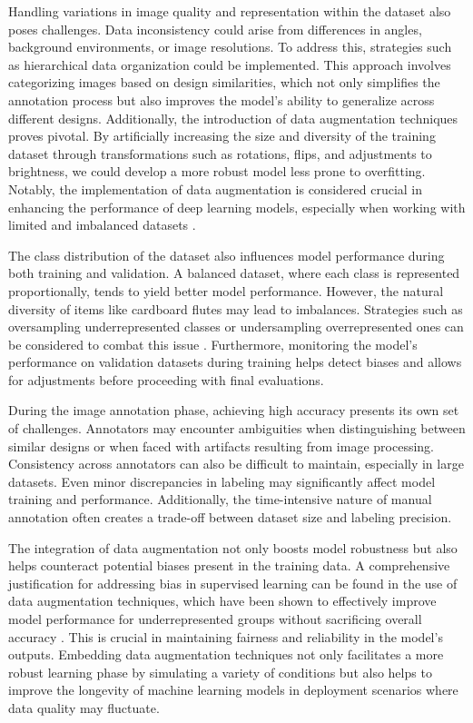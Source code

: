 Handling variations in image quality and representation within the dataset also poses challenges. Data inconsistency could arise from differences in angles, background environments, or image resolutions. To address this, strategies such as hierarchical data organization could be implemented. This approach involves categorizing images based on design similarities, which not only simplifies the annotation process but also improves the model's ability to generalize across different designs. Additionally, the introduction of data augmentation techniques proves pivotal. By artificially increasing the size and diversity of the training dataset through transformations such as rotations, flips, and adjustments to brightness, we could develop a more robust model less prone to overfitting. Notably, the implementation of data augmentation is considered crucial in enhancing the performance of deep learning models, especially when working with limited and imbalanced datasets \cite{krizhevsky2012imagenet}.



The class distribution of the dataset also influences model performance during both training and validation. A balanced dataset, where each class is represented proportionally, tends to yield better model performance. However, the natural diversity of items like cardboard flutes may lead to imbalances. Strategies such as oversampling underrepresented classes or undersampling overrepresented ones can be considered to combat this issue \cite{buda2018systematic}. Furthermore, monitoring the model's performance on validation datasets during training helps detect biases and allows for adjustments before proceeding with final evaluations.


During the image annotation phase, achieving high accuracy presents its own set of challenges. Annotators may encounter ambiguities when distinguishing between similar designs or when faced with artifacts resulting from image processing. Consistency across annotators can also be difficult to maintain, especially in large datasets. Even minor discrepancies in labeling may significantly affect model training and performance. Additionally, the time-intensive nature of manual annotation often creates a trade-off between dataset size and labeling precision.



The integration of data augmentation not only boosts model robustness but also helps counteract potential biases present in the training data. A comprehensive justification for addressing bias in supervised learning can be found in the use of data augmentation techniques, which have been shown to effectively improve model performance for underrepresented groups without sacrificing overall accuracy \cite{zhang2018mixup}. This is crucial in maintaining fairness and reliability in the model's outputs. Embedding data augmentation techniques not only facilitates a more robust learning phase by simulating a variety of conditions but also helps to improve the longevity of machine learning models in deployment scenarios where data quality may fluctuate.



